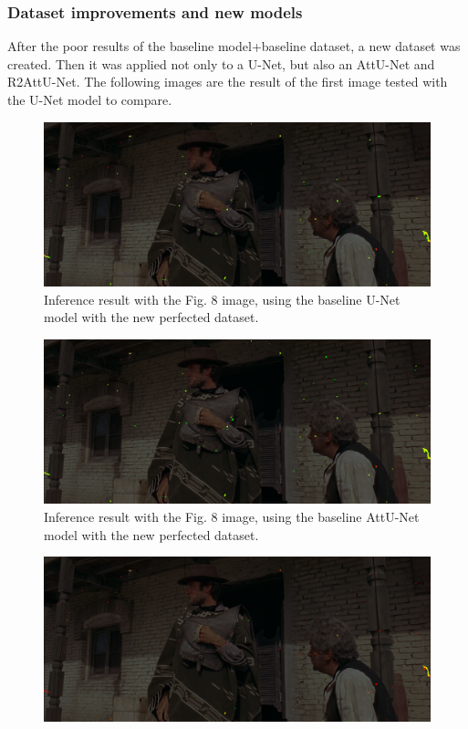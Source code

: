 \documentclass[openany, 12pt]{article}
\begin{document}
{\subsubsection*{Dataset improvements and new models}
After the poor results of the baseline model+baseline dataset, a new dataset was created. Then it was applied not only to a U-Net, but also an AttU-Net and R2AttU-Net. The following images are the result of the first image tested with the U-Net model to compare.\\
\begin{figure}[h!]
	\centering
	\includegraphics[width=0.7\linewidth]{images/punado_dollars_frame_0122-mask_big_dataset_unet_50_v1.png_comparaison.png}
	\caption{\smaller Inference result with the Fig. 8 image, using the baseline U-Net model with the new perfected dataset.} 
\end{figure}
\begin{figure}[h!]
	\centering
	\includegraphics[width=0.7\linewidth]{images/punado_dollars_frame_0122-mask_big_dataset_attunet_40_v1.png_comparaison.png}
	\caption{\smaller Inference result with the Fig. 8 image, using the baseline AttU-Net model with the new perfected dataset.} 
	\label{fig:11}
\end{figure}
\begin{figure}[h!]
	\centering
	\includegraphics[width=0.7\linewidth]{images/punado_dollars_frame_0122-mask_big_dataset_r2attunetreduced_60_v1.png_comparaison.png}

\end{figure}}
\end{document}
